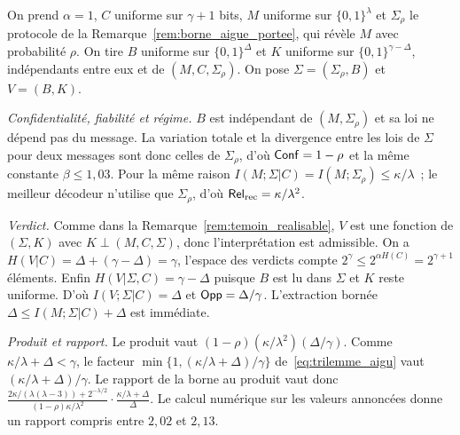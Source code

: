 \begin{sloppypar}
\begin{Preuve}
On prend $\alpha = 1$, $C$ uniforme sur $\gamma + 1$ bits, $M$ uniforme sur
$\{0,1\}^\lambda$ et $\Sigma_\rho$ le protocole de la Remarque~\ref{rem:borne_aigue_portee},
qui r\'ev\`ele $M$ avec probabilit\'e $\rho$. On tire $B$ uniforme sur $\{0,1\}^\Delta$ et $K$
uniforme sur $\{0,1\}^{\gamma-\Delta}$, ind\'ependants entre eux et de $(M, C, \Sigma_\rho)$. On
pose $\Sigma = (\Sigma_\rho, B)$ et $V = (B, K)$.

\emph{Confidentialit\'e, fiabilit\'e et r\'egime.} $B$ est ind\'ependant de $(M, \Sigma_\rho)$ et
sa loi ne d\'epend pas du message. La variation totale et la divergence entre les lois de
$\Sigma$ pour deux messages sont donc celles de $\Sigma_\rho$, d'o\`u $\mathsf{Conf} = 1 - \rho$ et la
m\^eme constante $\beta \leq 1{,}03$. Pour la m\^eme raison $I(M;\Sigma|C) = I(M;\Sigma_\rho)
\leq \kappa/\lambda$~; le meilleur d\'ecodeur n'utilise que $\Sigma_\rho$, d'o\`u
$\mathsf{Rel}_{\mathrm{rec}} = \kappa/\lambda^2$.

\emph{Verdict.} Comme dans la Remarque~\ref{rem:temoin_realisable}, $V$ est une fonction de
$(\Sigma, K)$ avec $K \perp (M, C, \Sigma)$, donc l'interpr\'etation est admissible. On a
$H(V|C) = \Delta + (\gamma - \Delta) = \gamma$, l'espace des verdicts compte
$2^\gamma \leq 2^{\alpha H(C)} = 2^{\gamma+1}$ \'el\'ements. Enfin $H(V|\Sigma, C) = \gamma - \Delta$
puisque $B$ est lu dans $\Sigma$ et $K$ reste uniforme. D'o\`u $I(V;\Sigma|C) = \Delta$ et
$\mathsf{Opp} = \Delta/\gamma$. L'extraction born\'ee $\Delta \leq I(M;\Sigma|C) + \Delta$ est
imm\'ediate.

\emph{Produit et rapport.} Le produit vaut $(1-\rho)(\kappa/\lambda^2)(\Delta/\gamma)$. Comme
$\kappa/\lambda + \Delta < \gamma$, le facteur
$\min\{1, (\kappa/\lambda + \Delta)/\gamma\}$ de~\eqref{eq:trilemme_aigu} vaut
$(\kappa/\lambda + \Delta)/\gamma$. Le rapport de la borne au produit vaut donc
$\frac{2\kappa/(\lambda(\lambda-3)) + 2^{-\lambda/2}}{(1-\rho)\kappa/\lambda^2}
\cdot \frac{\kappa/\lambda + \Delta}{\Delta}$. Le calcul num\'erique sur les valeurs annonc\'ees
donne un rapport compris entre $2{,}02$ et $2{,}13$.
\end{Preuve}


\end{sloppypar}
